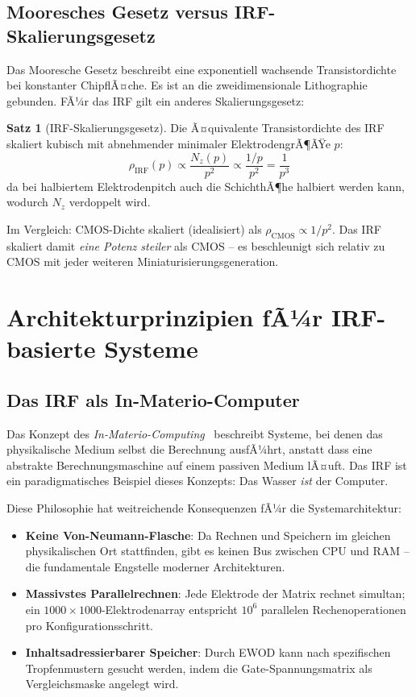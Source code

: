 ﻿\documentclass[a4paper,12pt]{scrreprt}
\theoremstyle{definition}
\newtheorem{satz}{Satz}[section]
\begin{document}
\subsection{Mooresches Gesetz versus IRF-Skalierungsgesetz}

Das Mooresche Gesetz beschreibt eine exponentiell wachsende Transistordichte
bei konstanter ChipflÃ¤che. Es ist an die zweidimensionale Lithographie
gebunden. FÃ¼r das IRF gilt ein anderes Skalierungsgesetz:

\begin{satz}[IRF-Skalierungsgesetz]
	Die Ã¤quivalente Transistordichte des IRF skaliert kubisch mit abnehmender
	minimaler ElektrodengrÃ¶ÃŸe $p$:
	\begin{equation}
		\rho_{\mathrm{IRF}}(p) \propto \frac{N_z(p)}{p^2} \propto \frac{1/p}{p^2} = \frac{1}{p^3}
		\label{eq:irf_skalierung}
	\end{equation}
	da bei halbiertem Elektrodenpitch auch die SchichthÃ¶he halbiert werden kann,
	wodurch $N_z$ verdoppelt wird.
\end{satz}

Im Vergleich: CMOS-Dichte skaliert (idealisiert) als $\rho_{\mathrm{CMOS}} \propto 1/p^2$.
Das IRF skaliert damit \emph{eine Potenz steiler} als CMOS -- es beschleunigt
sich relativ zu CMOS mit jeder weiteren Miniaturisierungsgeneration.

\section{Architekturprinzipien fÃ¼r IRF-basierte Systeme}

\subsection{Das IRF als In-Materio-Computer}

Das Konzept des \emph{In-Materio-Computing}~\cite{miller2002} beschreibt Systeme,
bei denen das physikalische Medium selbst die Berechnung ausfÃ¼hrt, anstatt
dass eine abstrakte Berechnungsmaschine auf einem passiven Medium lÃ¤uft.
Das IRF ist ein paradigmatisches Beispiel dieses Konzepts: Das Wasser
\emph{ist} der Computer.

Diese Philosophie hat weitreichende Konsequenzen fÃ¼r die Systemarchitektur:
\begin{itemize}
	\item \textbf{Keine Von-Neumann-Flasche}: Da Rechnen und Speichern
	im gleichen physikalischen Ort stattfinden, gibt es keinen Bus
	zwischen CPU und RAM -- die fundamentale Engstelle moderner Architekturen.
	\item \textbf{Massivstes Parallelrechnen}: Jede Elektrode der Matrix
	rechnet simultan; ein $1000 \times 1000$-Elektrodenarray entspricht
	$10^6$ parallelen Rechenoperationen pro Konfigurationsschritt.
	\item \textbf{Inhaltsadressierbarer Speicher}: Durch EWOD kann nach
	spezifischen Tropfenmustern gesucht werden, indem die Gate-Spannungsmatrix
	als Vergleichsmaske angelegt wird.
\end{itemize}
\end{document}

